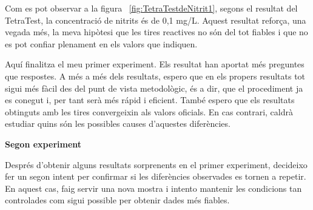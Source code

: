 Com es pot observar a la figura~ \ref{fig:TetraTestdeNitrit1}, segons el resultat del TetraTest, la concentració de nitrits és de 0,1 mg/L. Aquest resultat reforça, una vegada més, la meva hipòtesi que les tires reactives no són del tot fiables i que no es pot confiar plenament en els valors que indiquen.

Aquí finalitza el meu primer experiment. Els resultat han aportat més preguntes que respostes. A més a més dels resultats, espero que en els propers resultats tot sigui més fàcil des del punt de vista metodològic, és a dir, que el procediment ja es conegut i, per tant serà més rápid i eficient. També espero que els resultats obtinguts amb les tires convergeixin als valors oficials. En cas contrari, caldrà estudiar quins són les possibles causes d'aquestes diferències.

{\Large \textbf{Segon experiment}}
\newline

Després d’obtenir alguns resultats sorprenents en el primer experiment, decideixo fer un segon intent per confirmar si les diferències observades es tornen a repetir. En aquest cas, faig servir una nova mostra i intento mantenir les condicions tan controlades com sigui possible per obtenir dades més fiables.

